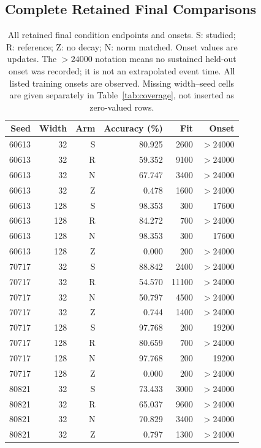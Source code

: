 \documentclass{article}
\begin{document}
\subsection{Complete Retained Final Comparisons}
\begin{table}[h]
\centering
\caption{All retained final condition endpoints and onsets. S: studied; R: reference; Z: no decay; N: norm matched. Onset values are updates. The $>24000$ notation means no sustained held-out onset was recorded; it is not an extrapolated event time. All listed training onsets are observed. Missing width--seed cells are given separately in Table~\ref{tab:coverage}, not inserted as zero-valued rows.}
\label{tab:allfinal}
\small
\begin{tabular}{rrrrrr}
\toprule
Seed & Width & Arm & Accuracy (\%) & Fit & Onset \\
\midrule
60613 & 32 & S & 80.925 & 2600 & $>24000$ \\
60613 & 32 & R & 59.352 & 9100 & $>24000$ \\
60613 & 32 & N & 67.747 & 3400 & $>24000$ \\
60613 & 32 & Z & 0.478 & 1600 & $>24000$ \\
60613 & 128 & S & 98.353 & 300 & 17600 \\
60613 & 128 & R & 84.272 & 700 & $>24000$ \\
60613 & 128 & N & 98.353 & 300 & 17600 \\
60613 & 128 & Z & 0.000 & 200 & $>24000$ \\
70717 & 32 & S & 88.842 & 2400 & $>24000$ \\
70717 & 32 & R & 54.570 & 11100 & $>24000$ \\
70717 & 32 & N & 50.797 & 4500 & $>24000$ \\
70717 & 32 & Z & 0.744 & 1400 & $>24000$ \\
70717 & 128 & S & 97.768 & 200 & 19200 \\
70717 & 128 & R & 80.659 & 700 & $>24000$ \\
70717 & 128 & N & 97.768 & 200 & 19200 \\
70717 & 128 & Z & 0.000 & 200 & $>24000$ \\
80821 & 32 & S & 73.433 & 3000 & $>24000$ \\
80821 & 32 & R & 65.037 & 9600 & $>24000$ \\
80821 & 32 & N & 70.829 & 3400 & $>24000$ \\
80821 & 32 & Z & 0.797 & 1300 & $>24000$ \\
\bottomrule
\end{tabular}
\end{table}
\end{document}
